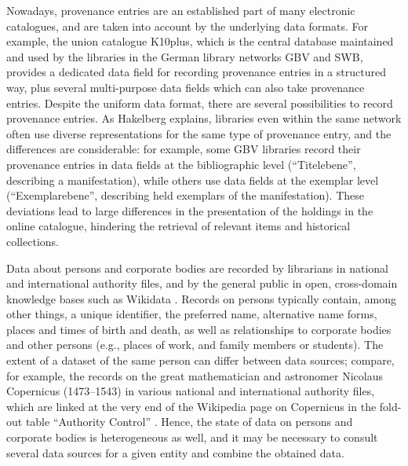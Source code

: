 Nowadays, provenance entries are an established part of 
many electronic catalogues,
and are taken into account by the underlying data formats.
For example, the union catalogue 
%
\gls{K10plus},
which is
the central database maintained and used by the libraries in the
%
%
German library networks \gls{GBV} and \gls{SWB},
provides a dedicated data field for recording provenance entries in a structured way,
plus several multi-purpose data fields which can also take provenance entries.
Despite the uniform data format,
there are several possibilities to record provenance entries.
As Hakelberg \autocite*[§4]{Hakelberg2016} explains,
libraries even within the same network often use diverse representations
for the same type of provenance entry, and the differences are considerable:
for example, some \gls{GBV} libraries record their provenance entries
in data fields at the bibliographic level (\enquote{\foreignlanguage{ngerman}{Titelebene}}, describing a manifestation),
while others use data fields at the exemplar level (\enquote{\foreignlanguage{ngerman}{Exemplarebene}}, describing held exemplars of the manifestation).
These deviations lead to large differences in the presentation
of the holdings in the online catalogue,
hindering the retrieval of relevant items and historical collections.

Data about persons and corporate bodies are recorded by librarians
in national and international authority files,
and by the general public 
in open, cross-domain knowledge bases such as Wikidata \autocite{Wikidata}.
Records on persons typically contain, among other things,
a unique identifier, the preferred name, alternative name forms,
places and times of birth and death,
as well as relationships to corporate bodies and other persons
(e.g., places of work, and family members or students).
The extent of a dataset of the same person can differ between data sources;
compare, for example, the records on the great mathematician and astronomer
Nicolaus Copernicus (1473--1543)
in various national and international authority files,
which are linked at the very end of the Wikipedia page on Copernicus
in the fold-out table \enquote{Authority Control}
\autocite{WikiCopernicusExternalLinks}.
Hence, the state of data on persons and corporate bodies is heterogeneous as well,
and it may be necessary
to consult several data sources for a given entity and combine the obtained data.

